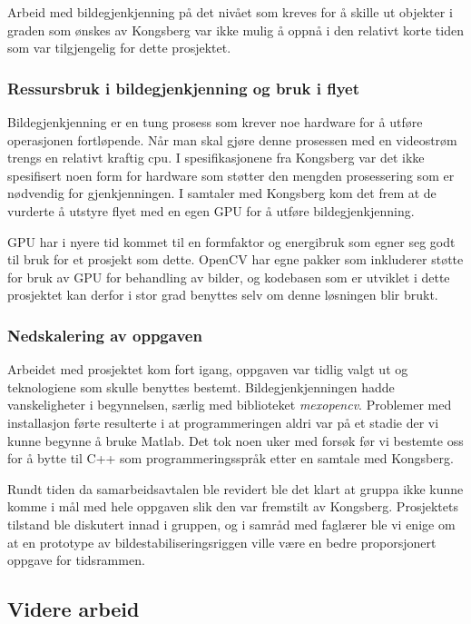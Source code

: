 Arbeid med bildegjenkjenning på det nivået som kreves for å skille ut objekter i graden som ønskes av Kongsberg var ikke mulig å oppnå i den relativt korte tiden som var tilgjengelig for dette prosjektet.


\subsubsection{Ressursbruk i bildegjenkjenning og bruk i flyet}

Bildegjenkjenning er en tung prosess som krever noe hardware for å utføre operasjonen fortløpende. Når man skal gjøre denne prosessen med en videostrøm trengs en relativt kraftig cpu. I spesifikasjonene fra Kongsberg \cite{LocalHawkPDF} var det ikke spesifisert noen form for hardware som støtter den mengden prosessering som er nødvendig for gjenkjenningen. I samtaler med Kongsberg kom det frem at de vurderte å utstyre flyet med en egen GPU for å utføre bildegjenkjenning. 

GPU har i nyere tid kommet til en formfaktor og energibruk som egner seg godt til bruk for et prosjekt som dette. OpenCV har egne pakker som inkluderer støtte for bruk av GPU for behandling av bilder, og kodebasen som er utviklet i dette prosjektet kan derfor i stor grad benyttes selv om denne løsningen blir brukt.

\subsubsection{Nedskalering av oppgaven}
Arbeidet med prosjektet kom fort igang, oppgaven var tidlig valgt ut og teknologiene som skulle benyttes bestemt. Bildegjenkjenningen hadde vanskeligheter i begynnelsen, særlig med biblioteket \emph{mexopencv}. Problemer med installasjon førte resulterte i at programmeringen aldri var på et stadie der vi kunne begynne å bruke Matlab. Det tok noen uker med forsøk før vi bestemte oss for å bytte til C++ som programmeringsspråk etter en samtale med Kongsberg.

Rundt tiden da samarbeidsavtalen ble revidert ble det klart at gruppa ikke kunne komme i mål med hele oppgaven slik den var fremstilt av Kongsberg. Prosjektets tilstand ble diskutert innad i gruppen, og i samråd med faglærer ble vi enige om at en prototype av bildestabiliseringsriggen ville være en bedre proporsjonert oppgave for tidsrammen.

\subsection{Videre arbeid}

